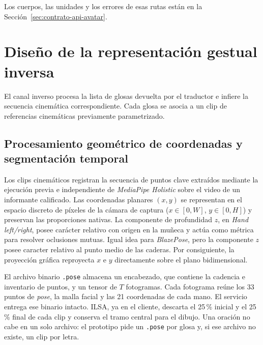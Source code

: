 Los cuerpos, las unidades y los errores de esas rutas están en la Sección~\ref{sec:contrato-api-avatar}.

\section{Diseño de la representación gestual inversa}
\label{sec:repr_inversa}

El canal inverso procesa la lista de glosas devuelta por el traductor e infiere la secuencia cinemática correspondiente. Cada glosa se asocia a un clip de referencias cinemáticas previamente parametrizado.

\subsection{Procesamiento geométrico de coordenadas y segmentación temporal}
Los clips cinemáticos registran la secuencia de puntos clave extraídos mediante la ejecución previa e independiente de \textit{MediaPipe Holistic} sobre el video de un informante calificado. Las coordenadas planares $(x, y)$ se representan en el espacio discreto de píxeles de la cámara de captura ($x \in [0, W]$, $y \in [0, H]$) y preservan las proporciones nativas. La componente de profundidad $z$, en \textit{Hand left/right}, posee carácter relativo con origen en la muñeca y actúa como métrica para resolver oclusiones mutuas. Igual idea para \textit{BlazePose}, pero la componente $z$ posee caracter relativo al punto medio de las caderas. Por consiguiente, la proyección gráfica reproyecta $x$ e $y$ directamente sobre el plano bidimensional.

El archivo binario \texttt{.pose} almacena un encabezado, que contiene la cadencia e inventario de puntos, y un tensor de $T$ fotogramas. Cada fotograma reúne los 33 puntos de \textit{pose}, la malla facial y las 21 coordenadas de cada mano. El servicio entrega ese binario intacto. ILSA, ya en el cliente, descarta el 25\,\% inicial y el 25\,\% final de cada clip y conserva el tramo central para el dibujo. Una oración no cabe en un solo archivo: el prototipo pide un \texttt{.pose} por glosa y, si ese archivo no existe, un clip por letra.

